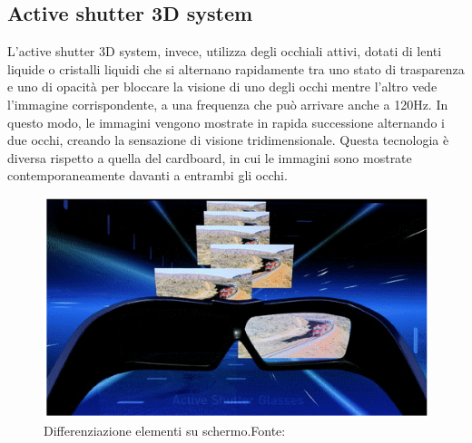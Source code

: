 \documentclass[
a4paper,
cleardoublepage=empty,
headings=twolinechapter,
numbers=autoenddot,
]{scrbook}
\begin{document}
	\subsection{Active shutter 3D system}
	   L'active shutter 3D system, invece, utilizza degli occhiali attivi, dotati di lenti liquide o cristalli liquidi che si alternano rapidamente tra uno stato di trasparenza e uno di opacità per bloccare la visione di uno degli occhi mentre l'altro vede l'immagine corrispondente, a una frequenza che può arrivare anche a 120Hz. In questo modo, le immagini vengono mostrate in rapida successione alternando i due occhi, creando la sensazione di visione tridimensionale. Questa tecnologia è diversa rispetto a quella del cardboard, in cui le immagini sono mostrate contemporaneamente davanti a entrambi gli occhi.
		\begin{figure}[H]
		\centering
		\includegraphics[width=0.6\linewidth]{image/active-shutter-3d-technology}
		\caption{Differenziazione elementi su schermo.Fonte:\cite{active-shutter-3d_image}}
		\label{fig:occhiali active-shutter-3d-technology}
	\end{figure}
\end{document}
